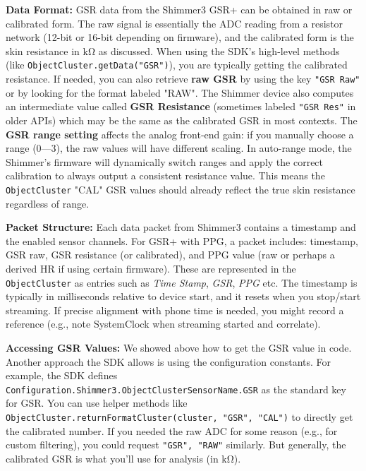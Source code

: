 {{\textbf{Data Format:} GSR data from the Shimmer3 GSR+ can be obtained in raw
or calibrated form. The raw signal is essentially the ADC reading from a
resistor network (12-bit or 16-bit depending on firmware), and the
calibrated form is the skin resistance in kΩ as discussed. When using
the SDK's high-level methods (like \texttt{ObjectCluster.getData("GSR")}), you
are typically getting the calibrated resistance. If needed, you can also
retrieve \textbf{raw GSR} by using the key \texttt{"GSR Raw"} or by looking for the
format labeled "RAW". The Shimmer device also computes an intermediate
value called \textbf{GSR Resistance} (sometimes labeled \texttt{"GSR Res"} in older
APIs) which may be the same as the calibrated GSR in most contexts. The
\textbf{GSR range setting} affects the analog front-end gain: if you manually
choose a range (0---3), the raw values will have different scaling. In
auto-range mode, the Shimmer's firmware will dynamically switch ranges
and apply the correct calibration to always output a consistent
resistance
value\cite{ElectrodermalActivityWiki}.
This means the \texttt{ObjectCluster} "CAL" GSR values should already reflect
the true skin resistance regardless of range.

\textbf{Packet Structure:} Each data packet from Shimmer3 contains a
timestamp and the enabled sensor channels. For GSR+ with PPG, a packet
includes: timestamp, GSR raw, GSR resistance (or calibrated), and PPG
value (raw or perhaps a derived HR if using certain firmware). These are
represented in the \texttt{ObjectCluster} as entries such as \textit{Time Stamp},
\textit{GSR}, \textit{PPG} etc. The timestamp is typically in milliseconds relative to
device start, and it resets when you stop/start streaming. If precise
alignment with phone time is needed, you might record a reference (e.g.,
note SystemClock when streaming started and correlate).

\textbf{Accessing GSR Values:} We showed above how to get the GSR value in
code. Another approach the SDK allows is using the configuration
constants. For example, the SDK defines
\texttt{Configuration.Shimmer3.ObjectClusterSensorName.GSR} as the standard key
for
GSR\cite{InstantStressSmartphone2019}.
You can use helper methods like
\texttt{ObjectCluster.returnFormatCluster(cluster, "GSR", "CAL")} to directly
get the calibrated number. If you needed the raw ADC for some reason
(e.g., for custom filtering), you could request \texttt{"GSR", "RAW"}
similarly. But generally, the calibrated GSR is what you'll use for
analysis (in kΩ).

}}
